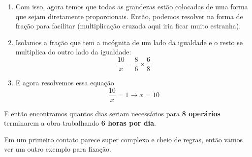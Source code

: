 \begin{exemplo}
\begin{enumerate}
\begin{table}[H]
        \end{table}
        \item Com isso, agora temos que todas as grandezas estão colocadas de uma forma que sejam diretamente proporcionais. Então, podemos resolver na forma de fração para facilitar (multiplicação cruzada aqui iria ficar muito estranha).
        \item Isolamos a fração que tem a incógnita de um lado da igualdade e o resto se multiplica do outro lado da igualdade:
        \begin{equation}
            \frac{10}{x}=\frac{8}{6}\times\frac{6}{8}
        \end{equation}
        \item E agora resolvemos essa equação
        \begin{equation}
            \frac{10}{x}=1 \xrightarrow{}x=10
        \end{equation}
    \end{enumerate}

    E então encontramos quantos dias seriam necessários para \textbf{8 operários} terminarem a obra trabalhando \textbf{6 horas por dia}.
\end{exemplo}

Em um primeiro contato parece super complexo e cheio de regras, então vamos ver um outro exemplo para fixação.

